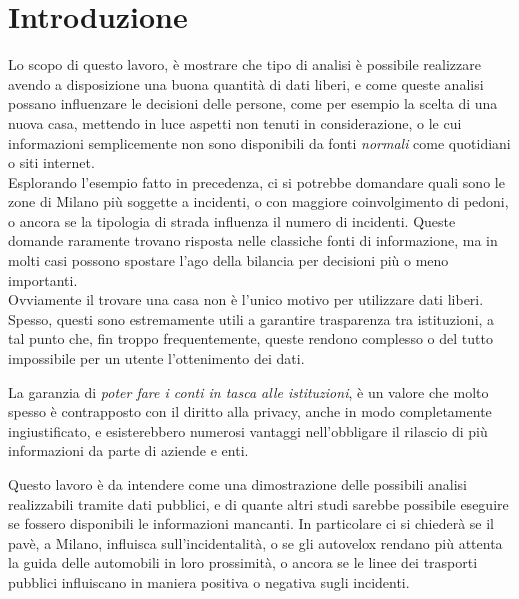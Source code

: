 \documentclass[a4paper]{report}
\begin{document}
\chapter{Introduzione}


Lo scopo di questo lavoro, è mostrare che tipo di analisi è possibile realizzare 
avendo a disposizione una buona quantità di dati liberi, e come queste analisi possano 
influenzare le decisioni delle persone, come per esempio la scelta di una nuova casa, 
mettendo in luce aspetti non tenuti in considerazione, o le cui informazioni semplicemente 
non sono disponibili da fonti \textit{normali} come quotidiani o siti internet.\\

Esplorando l'esempio fatto in precedenza, ci si potrebbe domandare quali sono le zone 
di Milano più soggette a incidenti, o con maggiore coinvolgimento di pedoni, 
o ancora se la tipologia di strada influenza il numero di incidenti. 
Queste domande raramente trovano risposta nelle classiche fonti di informazione, 
ma in molti casi possono spostare l'ago della bilancia per decisioni più o meno 
importanti.\\

Ovviamente il trovare una casa non è l'unico motivo per utilizzare dati liberi. 
Spesso, questi sono estremamente utili a garantire trasparenza tra istituzioni, 
a tal punto che, fin troppo frequentemente, queste rendono complesso o del tutto impossibile 
per un utente l'ottenimento dei dati.

La garanzia di \textit{poter fare i conti in tasca alle istituzioni}, è un valore che molto 
spesso è contrapposto con il diritto alla privacy, anche in modo completamente ingiustificato, 
e esisterebbero numerosi vantaggi nell'obbligare il rilascio di più informazioni da parte di 
aziende e enti.\\

Questo lavoro è da intendere come una dimostrazione delle possibili analisi realizzabili 
tramite dati pubblici, e di quante altri studi sarebbe possibile eseguire se fossero 
disponibili le informazioni mancanti.
In particolare ci si chiederà se il pavè, a Milano, influisca sull'incidentalità, 
o se gli autovelox rendano più attenta la guida delle automobili in loro prossimità, o 
ancora se le linee dei trasporti pubblici influiscano in maniera positiva o negativa sugli 
incidenti.
\end{document}
